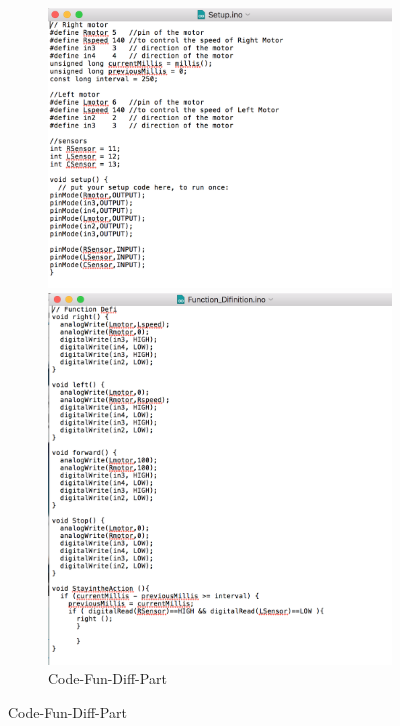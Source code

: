\documentclass[11pt]{report}
\begin{document}
		\begin{figure}[]
			
					\begin{subfigure}[normal]{0.5\textwidth}
						\includegraphics[scale=0.3]{Ch4-Executing/Code-Setup-Part}
						\caption{Code-Setup-Part}
						\label{subfiger:A}
												
						\includegraphics[scale=0.3]{Ch4-Executing/Code-Fun_Diff-Part}
						\caption{Code-Fun-Diff-Part}
						\label{subfiger:B}
						

\end{subfigure}
\end{figure}
\end{document}
